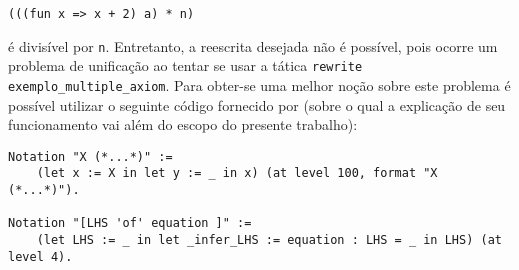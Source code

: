 {{    \begin{lstlisting}[language = coq,frame=single,tabsize=1]
(((fun x => x + 2) a) * n)
    \end{lstlisting} 
é divisível por \lstinline[language = coq]!n!. Entretanto, a reescrita desejada não é possível, pois ocorre um problema de unificação ao tentar se usar a tática \lstinline[language = coq]!rewrite exemplo_multiple_axiom!. Para obter-se uma melhor noção sobre este problema é possível utilizar o seguinte código fornecido por \cite{assia_mahboubi_2022_7118596} (sobre o qual a explicação de seu funcionamento vai além do escopo do presente trabalho):

    \begin{lstlisting}[language = coq,frame=single,tabsize=1]
Notation "X (*...*)" :=
    (let x := X in let y := _ in x) (at level 100, format "X  (*...*)").

Notation "[LHS 'of' equation ]" := 
    (let LHS := _ in let _infer_LHS := equation : LHS = _ in LHS) (at level 4).


\end{lstlisting}}}
